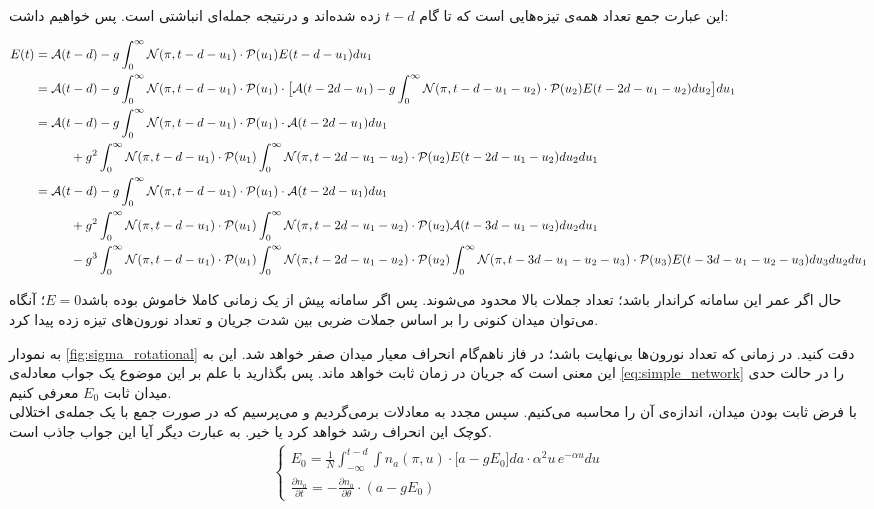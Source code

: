 این عبارت جمع تعداد همه‌ی تیزه‌هایی است که تا گام $t-d$ زده شده‌اند و درنتیجه جمله‌ای انباشتی است. پس خواهیم داشت:
\begin{landscape}
	\begin{align}
		E(t) &= \mathcal{A}(t-d) - g\int_{0}^{\infty} \mathcal{N}(\pi, t-d-u_1) \cdot \mathcal{P}(u_{1}) E(t-d-u_1) du_1\\
		&= \mathcal{A}(t-d) - g\int_{0}^{\infty} \mathcal{N}(\pi, t-d-u_1) \cdot \mathcal{P}(u_{1}) \cdot \big[ \mathcal{A}(t-2d-u_1) - g\int_{0}^{\infty} \mathcal{N}(\pi, t-d- u_1-u_2) \cdot \mathcal{P}(u_{2}) E(t-2d-u_1-u_2) du_2 \big] du_1\\
		&= \mathcal{A}(t-d) - g\int_{0}^{\infty} \mathcal{N}(\pi, t-d-u_1) \cdot \mathcal{P}(u_{1}) \cdot \mathcal{A}(t-2d-u_1) du_1\\ 
		&\hspace{1 cm}+ g^2 \int_{0}^{\infty} \mathcal{N}(\pi, t-d-u_1) \cdot \mathcal{P}(u_{1})\int_{0}^{\infty} \mathcal{N}(\pi, t-2d-u_1-u_2) \cdot \mathcal{P}(u_{2}) E(t-2d-u_1-u_2) du_2 du_1\\
		&= \mathcal{A}(t-d) - g\int_{0}^{\infty} \mathcal{N}(\pi, t-d-u_1) \cdot \mathcal{P}(u_{1}) \cdot \mathcal{A}(t-2d-u_1) du_1\\ 
		&\hspace{1 cm}+ g^2 \int_{0}^{\infty} \mathcal{N}(\pi, t-d-u_1) \cdot \mathcal{P}(u_{1})\int_{0}^{\infty} \mathcal{N}(\pi, t-2d-u_1-u_2) \cdot \mathcal{P}(u_{2}) \mathcal{A}(t-3d-u_1-u_2) du_2 du_1\\
		&\hspace{1 cm}- g^3 \int_{0}^{\infty} \mathcal{N}(\pi, t-d-u_1) \cdot \mathcal{P}(u_{1})\int_{0}^{\infty} \mathcal{N}(\pi, t-2d-u_1-u_2) \cdot \mathcal{P}(u_{2}) \int_{0}^{\infty} \mathcal{N}(\pi, t-3d-u_1-u_2-u_3) \cdot \mathcal{P}(u_{3}) E(t-3d-u_1-u_2-u_3) du_3 du_2 du_1
	\end{align}
\end{landscape}

\restoregeometry 

حال اگر عمر این سامانه کراندار باشد؛ تعداد جملات بالا محدود می‌شوند. پس اگر سامانه پیش از یک زمانی کاملا خاموش بوده باشد$E = 0$؛ آنگاه می‌توان میدان کنونی را بر اساس جملات ضربی بین شدت جریان و تعداد نورون‌های تیزه زده پیدا کرد.


به نمودار \ref{fig:sigma_rotational} دقت کنید. در زمانی که تعداد نورون‌ها بی‌نهایت باشد؛ در فاز ناهم‌گام انحراف معیار میدان صفر خواهد شد. این به این معنی است که جریان در زمان ثابت خواهد ماند. پس بگذارید با علم بر این موضوع یک جواب معادله‌ی \ref{eq:simple_network} را در حالت حدی میدان ثابت $E_0$ معرفی کنیم.\\
با فرض ثابت بودن میدان، اندازه‌ی آن را محاسبه می‌کنیم. سپس مجدد به معادلات برمی‌گردیم و می‌پرسیم که در صورت جمع با یک جمله‌ی اختلالی کوچک این انحراف رشد خواهد کرد یا خیر. به عبارت دیگر آیا این جواب جاذب است.\\
\begin{align}
	\begin{cases}
		E_0 = \frac{1}{N}\int_{- \infty}^{t - d} \int n_a(\pi,u) \cdot \big[ a - g E_0 \big] da \cdot \alpha^2 u\, e^{-\alpha u} du \\
		\frac{\partial n_a}{\partial t} = - \frac{\partial n_a}{\partial \theta} \cdot (a - g E_0 )
	\end{cases}
\end{align}

